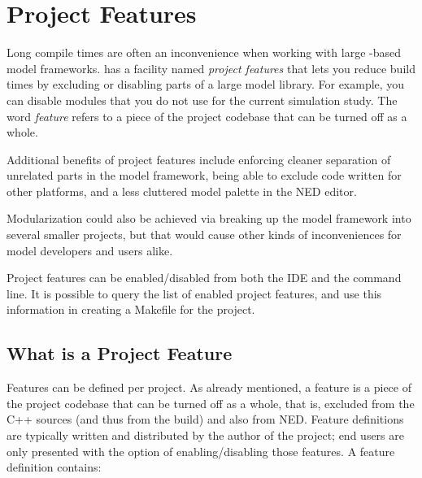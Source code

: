 
\section{Project Features}
\label{sec:build-sim-progs:project-features}

Long compile times are often an inconvenience when working with large
{\opp}-based model frameworks. {\opp} has a facility named \textit{project
features} that lets you reduce build times by excluding or disabling parts
of a large model library. For example, you can disable modules that you do
not use for the current simulation study. The word \textit{feature} refers
to a piece of the project codebase that can be turned off as a whole.

Additional benefits of project features include enforcing cleaner
separation of unrelated parts in the model framework, being able to exclude
code written for other platforms, and a less cluttered model palette in the
NED editor.

\begin{note}
  Modularization could also be achieved via breaking up the model framework
  into several smaller projects, but that would cause other kinds of
  inconveniences for model developers and users alike.
\end{note}

Project features can be enabled/disabled from both the IDE and the command line.
It is possible to query the list of enabled project features, and use this
information in creating a Makefile for the project.


\subsection{What is a Project Feature}
\label{sec:build-sim-progs:project-feature}

Features can be defined per project. As already mentioned, a feature is a piece of the
project codebase that can be turned off as a whole, that is, excluded from the C++ sources
(and thus from the build) and also from NED. Feature definitions are typically written
and distributed by the author of the project; end users are only presented with the
option of enabling/disabling those features. A feature definition contains:

